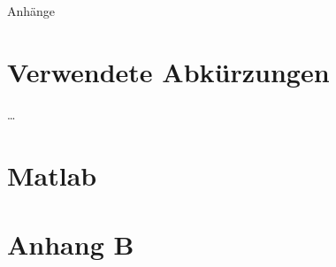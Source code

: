﻿\begin{appendix}
\newpage
\huge{Anhänge}
\thispagestyle{plain}
\section{Verwendete Abkürzungen}
\dots{}

\newpage
\thispagestyle{plain}
\section{Matlab }

\newpage
\thispagestyle{plain}
\section[AppendixB]{Anhang B}


\end{appendix}
